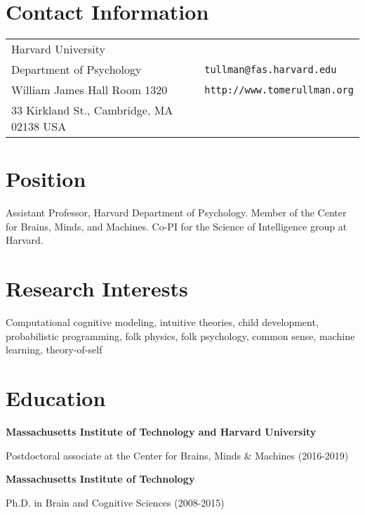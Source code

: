 \documentclass[margin,line,pifont,palatino,courier]{res}
\newenvironment{list1}{
  \begin{list}{\ding{113}}{%
      \setlength{\itemsep}{0in}
      \setlength{\parsep}{0in} \setlength{\parskip}{0in}
      \setlength{\topsep}{0in} \setlength{\partopsep}{0in}
      \setlength{\leftmargin}{0.17in}}}{\end{list}}
\begin{document}

\begin{resume}

\section{\sc Contact Information}

\vspace{.05in}
\begin{tabular}{@{}p{2.75in}p{2in}}
Harvard University  \\
Department of Psychology                        & \verb+tullman@fas.harvard.edu+\\
William James Hall Room 1320            & \verb+http://www.tomerullman.org+\\
33 Kirkland St., Cambridge, MA 02138 USA               & \\
\end{tabular}

\section{\sc Position}
Assistant Professor, Harvard Department of Psychology. Member of the Center for Brains, Minds, and Machines. Co-PI for the Science of Intelligence group at Harvard. 

\section{\sc Research Interests}
Computational cognitive modeling, intuitive theories, child development, probabilistic programming, folk physics, folk psychology, common sense, machine learning, theory-of-self

\section{\sc Education}


{\bf Massachusetts Institute of Technology and Harvard University}\\
\vspace*{-.1in}
\begin{list1}
\item[] Postdoctoral associate at the Center for Brains, Minds \& Machines (2016-2019)
\end{list1}

{\bf Massachusetts Institute of Technology}\\
\vspace*{-.1in}
\begin{list1}
\item[] Ph.D. in Brain and Cognitive Sciences (2008-2015)


\end{list1}
\end{resume}
\end{document}
